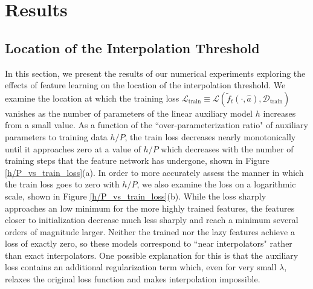 \documentclass[11pt]{article}
\begin{document}
\section{Results}
\label{Results}

\subsection{Location of the Interpolation Threshold}
In this section, we present the results of our numerical experiments exploring the effects of feature learning on the location of the interpolation threshold. We examine the location at which the training loss $\mathcal L_\text{train} \equiv \mathcal L (\tilde f_t(\cdot, \hat 
a), \mathcal D_\text{train})$ vanishes as the number of parameters of the linear auxiliary model $h$ increases from a small value. As a function of the ``over-parameterization ratio" of auxiliary parameters to training data $h/P$, the train loss decreases nearly monotonically until it approaches zero at a value of $h/P$ which decreases with the number of training steps that the feature network has undergone, shown in Figure \ref{h/P_vs_train_loss}(a). In order to more accurately assess the manner in which the train loss goes to zero with $h/P$, we also examine the loss on a logarithmic scale, shown in Figure \ref{h/P_vs_train_loss}(b). While the loss sharply approaches an low minimum for the more highly trained features, the features closer to initialization decrease much less sharply and reach a minimum several orders of magnitude larger. Neither the trained nor the lazy features achieve a loss of exactly zero, so these models correspond to ``near interpolators" rather than exact interpolators. One possible explanation for this is that the auxiliary loss contains an additional regularization term which, even for very small $\lambda$, relaxes the original loss function and makes interpolation impossible.\\
\end{document}

